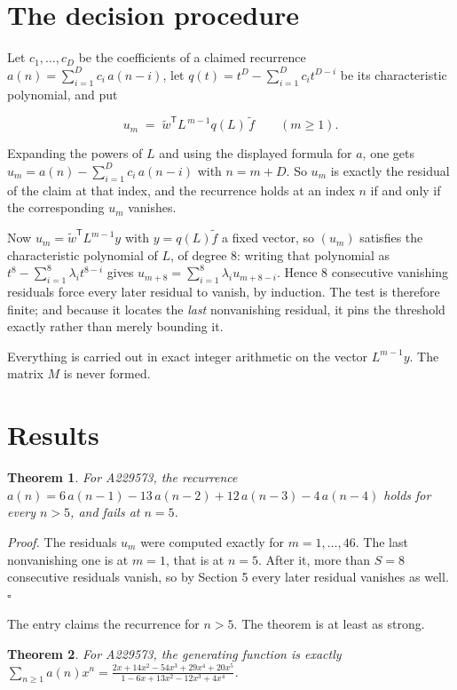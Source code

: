 \documentclass[11pt]{article}
\newtheorem{theorem}{Theorem}
\theoremstyle{definition}
\begin{document}
\section{The decision procedure}

Let $c_1,\dots,c_D$ be the coefficients of a claimed recurrence $a(n) = \sum_{i=1}^{D} c_i\,a(n-i)$, let $q(t) = t^{D} - \sum_{i=1}^{D} c_i t^{D-i}$ be its characteristic polynomial, and put

\[u_m \;=\; \tilde w^{\mathsf T} L^{\,m-1} q(L)\,\tilde f \qquad (m \ge 1).\]

Expanding the powers of $L$ and using the displayed formula for $a$, one gets $u_m = a(n) - \sum_{i=1}^{D} c_i\,a(n-i)$ with $n = m + D$. So $u_m$ is exactly the residual of the claim at that index, and the recurrence holds at an index $n$ if and only if the corresponding $u_m$ vanishes.

Now $u_m = \tilde w^{\mathsf T} L^{m-1} y$ with $y = q(L)\tilde f$ a fixed vector, so $(u_m)$ satisfies the characteristic polynomial of $L$, of degree $8$: writing that polynomial as $t^{8} - \sum_{i=1}^{8} \lambda_i t^{8-i}$ gives $u_{m+8} = \sum_{i=1}^{8} \lambda_i u_{m+8-i}$. Hence $8$ consecutive vanishing residuals force every later residual to vanish, by induction. The test is therefore finite; and because it locates the {\itshape last} nonvanishing residual, it pins the threshold exactly rather than merely bounding it.

Everything is carried out in exact integer arithmetic on the vector $L^{m-1}y$. The matrix $M$ is never formed.

\section{Results}

\begin{theorem} For A229573, the recurrence $a(n) = 6\,a(n-1) - 13\,a(n-2) + 12\,a(n-3) - 4\,a(n-4)$ holds for every $n > 5$, and fails at $n = 5$.\end{theorem}

{\itshape Proof.} The residuals $u_m$ were computed exactly for $m = 1,\dots,46$. The last nonvanishing one is at $m = 1$, that is at $n = 5$. After it, more than $S = 8$ consecutive residuals vanish, so by Section 5 every later residual vanishes as well. $\square$

The entry claims the recurrence for $n > 5$. The theorem is at least as strong.

\begin{theorem} For A229573, the generating function is exactly $\sum_{n\ge 1} a(n)x^n = \frac{2x + 14x^{2} - 54x^{3} + 29x^{4} + 20x^{5}}{1 - 6x + 13x^{2} - 12x^{3} + 4x^{4}}$.\end{theorem}
\end{document}
